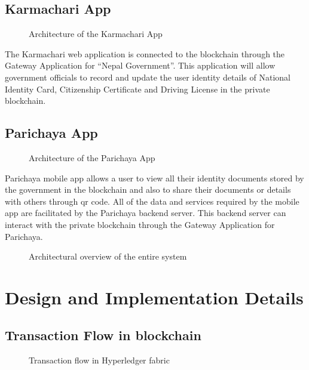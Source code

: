 \subsection{Karmachari App}
\vspace{15 pt}
\begin{figure}[H]
\centerline{}
\caption{Architecture of the Karmachari App}
\label{fig: KarmachariArchitecture.svg}
\end{figure}
The Karmachari web application is connected to the blockchain through the Gateway Application for “Nepal Government”. This application will allow government officials to record and update the user identity details of National Identity Card, Citizenship Certificate and Driving License in the private blockchain.

\subsection{Parichaya App}
\vspace{15 pt}
\begin{figure}[H]
\centerline{}
\caption{Architecture of the Parichaya App}
\label{fig: ParichayaArchitecture.svg}
\end{figure}
Parichaya mobile app allows a user to view all their identity documents stored by the government in the blockchain and also to share their documents or details with others through qr code. All of the data and services required by the mobile app are facilitated by the Parichaya backend server. This backend server can interact with the private blockchain through the Gateway Application for Parichaya.
\newpage
\begin{figure}[H]
\centerline{}
\caption{Architectural overview of the entire system}
\label{fig: SystemArchitecture.svg}
\end{figure}
\newpage
\section{Design and Implementation Details}
\vspace{15pt}
\subsection{Transaction Flow in blockchain}
\vspace{22pt}
\begin{figure} [H]
    \centering
  \centerline{}
    \caption[Transaction flow in Hyperledger fabric]{Transaction flow in Hyperledger fabric}
    \label{fig:TransactionFlow.jpg}
\end{figure}

